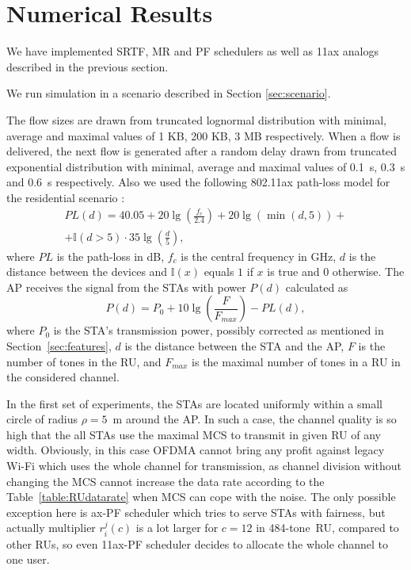 \section{Numerical Results}
\label{sec:numerical}


We have implemented SRTF, MR and PF schedulers as well as 11ax analogs described in the previous section.

We run simulation in a scenario described in Section \ref{sec:scenario}.

The flow sizes are drawn from truncated lognormal distribution with minimal, average and maximal values of 1 KB, 200 KB, 3 MB respectively. 
When a flow is delivered, the next flow is generated after a random delay drawn from truncated exponential distribution with minimal, average and maximal values of \SI{0.1}{\s}, \SI{0.3}{\s} and \SI{0.6}{\s} respectively.
Also we used the following 802.11ax path-loss model for the residential scenario \cite{presentation_scenarios}:
\begin{multline*}
PL(d) = 40.05 + 20 \lg\left(\frac{f_c}{2.4}\right) + 20 \lg(\min(d, 5)) + \\
+ \mathbb{I}(d > 5) \cdot 35 \lg\left(\frac{d}{5}\right),
\end{multline*}
where $PL$ is the path-loss in dB, $f_c$ is the central frequency in GHz, $d$ is the distance between the devices and $\mathbb{I}{(x) }$ equals $1$ if $x$ is true and $0$ otherwise.
The AP receives the signal from the STAs with power $P(d)$ calculated as
$$
P(d) = P_0 + 10 \lg\left(\frac{F}{F_{max}}\right) - PL(d),
$$
where $P_0$ is the STA's transmission power, possibly corrected as mentioned in Section~\ref{sec:features}, $d$ is the distance between the STA and the AP, $F$ is the number of tones in the RU, and $F_{max}$ is the maximal number of tones in a RU in the considered channel.

In the first set of experiments, the STAs are located uniformly within a small circle of radius $\rho = 5$~m around the AP.
In such a case, the channel quality is so high that the all STAs use the maximal MCS to transmit in given RU of any width.
Obviously, in this case OFDMA cannot bring any profit against legacy Wi-Fi which uses the whole channel for transmission, as channel division without changing the MCS cannot increase the data rate according to the Table~\ref{table:RUdatarate} when MCS can cope with the noise. The only possible exception here is ax-PF scheduler which tries to serve STAs with fairness, but actually multiplier $r^j_i (c)$ is a lot larger for $c=12$ in 484-tone~RU, compared to other RUs, so even 11ax-PF scheduler decides to allocate the whole channel to one user.

